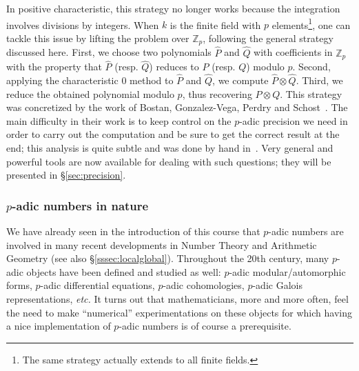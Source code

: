 \documentclass[11pt]{article}
\numberwithin{equation}{section}
\numberwithin{figure}{section}
\theoremstyle{definition}
\newcommand{\Z}{\mathbb Z}
\newcommand{\Zp}{\Z_p}
\begin{document}
In positive characteristic, this strategy no longer works because the 
integration involves divisions by integers. When $k$ is the finite 
field with $p$ elements\footnote{The same strategy actually extends to 
all finite fields.}, one can tackle this issue by lifting the problem
over $\Zp$, following the general strategy discussed here. First, we 
choose two polynomials $\hat P$ and $\hat Q$ with coefficients in $\Zp$ 
with the property that $\hat P$ (resp. $\hat Q$) reduces to $P$ (resp. 
$Q$) modulo $p$. Second, applying the characteristic $0$ method to
$\hat P$ and $\hat Q$, we compute $\hat P \otimes \hat Q$. Third, we
reduce the obtained polynomial modulo $p$, thus recovering $P \otimes
Q$. This strategy was concretized by the work of Bostan, Gonzalez-Vega, 
Perdry and Schost~\cite{BoGoPeSc05}.
The main difficulty in their work is to keep control on the $p$-adic 
precision we need in order to carry out the computation and be sure to 
get the correct result at the end; this analysis is quite subtle and was 
done by hand in~\cite{BoGoPeSc05}. Very general and powerful tools are now
available for dealing with such questions; they will be presented in
\S \ref{sec:precision}.

\subsubsection{$p$-adic numbers in nature}
\label{sssec:nature}

We have already seen in the introduction of this course that $p$-adic 
numbers are involved in many recent developments in Number Theory and 
Arithmetic Geometry (see also \S \ref{sssec:localglobal}). Throughout 
the 20th century, many $p$-adic objects have been defined and studied as 
well: $p$-adic modular/automorphic forms, $p$-adic differential 
equations, $p$-adic cohomologies, $p$-adic Galois representations, 
\emph{etc.} It turns out that mathematicians, more and more often, feel 
the need to make ``numerical'' experimentations on these objects for 
which having a nice implementation of $p$-adic numbers is of course a 
prerequisite.
\end{document}
